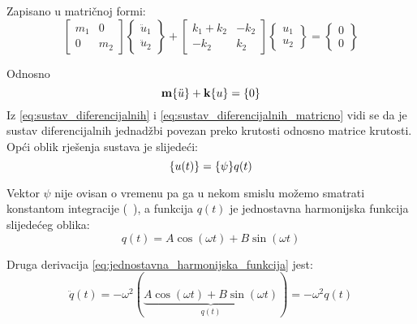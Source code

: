 Zapisano u matričnoj formi:
\begin{equation}\label{eq:sustav_diferencijalnih_matricno}
    \begin{bmatrix}
        m_1 & 0 \\
        0   & m_2
    \end{bmatrix}
    \begin{Bmatrix}
        \ddot{u}_1\\
        \ddot{u}_2
    \end{Bmatrix}
    +
    \begin{bmatrix}
        k_1+k_2 & -k_2\\
        -k_2 & k_2
    \end{bmatrix}
    \begin{Bmatrix}
        u_1\\
        u_2
    \end{Bmatrix}
    =
    \begin{Bmatrix}
        0\\
        0
    \end{Bmatrix}
\end{equation}

Odnosno
\begin{equation}\label{eq:sustav_diferencijalnih_matricni_kratko}
    \mm\vtor{u}{:}+\kk\vtor{u}{}=\vtor{0}{}
\end{equation}
Iz \eqref{eq:sustav_diferencijalnih} i \eqref{eq:sustav_diferencijalnih_matricno}
vidi se da je sustav diferencijalnih jednadžbi povezan preko krutosti odnosno
matrice krutosti. Opći oblik rješenja sustava je slijedeći:
\begin{equation}\label{eq:rjesenje_opcenitog_sustava}
    \vtor{u(t)}{} = \vtor{\psi}{}q(t)
\end{equation}

Vektor $\psi$ nije ovisan o vremenu pa ga u nekom smislu možemo smatrati konstantom
integracije (~\cite{diferencijalne}), a funkcija $q(t)$ je jednostavna harmonijska 
funkcija\footnotemark{} slijedećeg oblika: \begin{equation}\label{eq:jednostavna_harmonijska_funkcija}
    q(t)=A\cos(\omega t) + B\sin(\omega t)
\end{equation}


Druga derivacija \eqref{eq:jednostavna_harmonijska_funkcija} jest:
\begin{equation}\label{eq:jednostavna_harmonijska_funkcija_dd}
    \ddot{q}(t)=-\omega^2(
    \underbrace{
        A\cos(\omega t) + B\sin(\omega t)
    }_{\text{$q(t)$}}
    )
    =-\omega^2q(t)
\end{equation}

